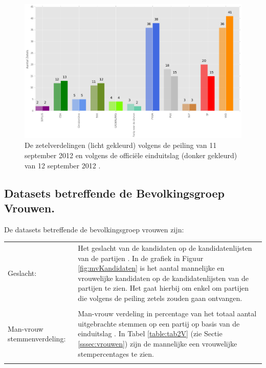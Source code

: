 \begin{figure}[H]
\centering
	\includegraphics[width=\linewidth]{peiling_zetels_landelijk.png}

			\caption{De zetelverdelingen (licht gekleurd) volgens de peiling van 11 september 2012 \citep{IPSOS} en volgens de offici\"{e}le einduitslag (donker gekleurd) van 12 september 2012 \citep{Kiesraad_databank}.}

\label{fig:pzL}
\end{figure}











\subsection{Datasets betreffende de Bevolkingsgroep Vrouwen.}
De datasets betreffende de bevolkingsgroep vrouwen zijn:\\




\noindent\begin{tabularx}{\textwidth}{LI}
Geslacht: & Het geslacht van de kandidaten op de kandidatenlijsten van de partijen \cite{Kiesraad_kandidatenlijsten}. In de grafiek in Figuur \ref{fig:mvKandidaten} is het aantal mannelijke en vrouwelijke kandidaten op de kandidatenlijsten van de partijen te zien. Het gaat hierbij om enkel om partijen die volgens de peiling zetels zouden gaan ontvangen.\\
\\
Man-vrouw stemmenverdeling: & Man-vrouw verdeling in percentage van het totaal aantal uitgebrachte stemmen op een partij op basis van de einduitslag \citep{IPSOS}. In Tabel \ref{table:tab2V} (zie Sectie \ref{sssec:vrouwen}) zijn de mannelijke een vrouwelijke stempercentages te zien. \\
\\  
\end{tabularx}

